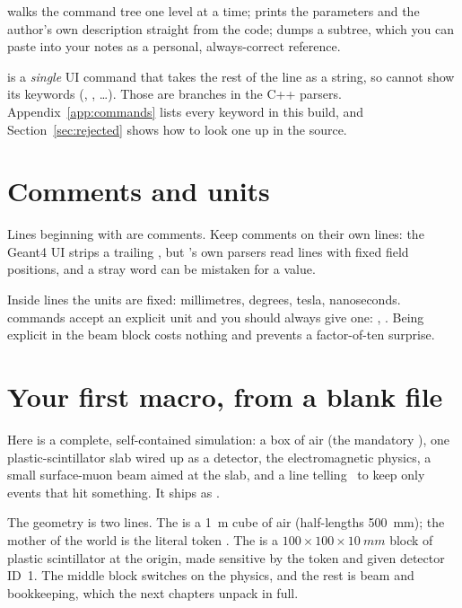  walks the command tree one level at a time;  prints the parameters and the author's own description straight from the code;  dumps a subtree, which you can paste into your notes as a personal, always-correct reference.

\begin{checkbuild}
 is a \emph{single} UI command that takes the rest of the line as a string, so  cannot show its keywords (, , \dots). Those are  branches in the C++ parsers. Appendix~\ref{app:commands} lists every keyword in this build, and Section~\ref{sec:rejected} shows how to look one up in the source.
\end{checkbuild}

\section{Comments and units}
Lines beginning with \code{#} are comments. Keep comments on their own lines: the Geant4 UI strips a trailing , but \musrSim's own parsers read  lines with fixed field positions, and a stray word can be mistaken for a value.

Inside  lines the units are fixed: millimetres, degrees, tesla, nanoseconds.  commands accept an explicit unit and you should always give one: , . Being explicit in the beam block costs nothing and prevents a factor-of-ten surprise.

\section{Your first macro, from a blank file}
\label{sec:firstmacro}
Here is a complete, self-contained simulation: a box of air (the mandatory ), one plastic-scintillator slab wired up as a detector, the electromagnetic physics, a small surface-muon beam aimed at the slab, and a line telling \musrSim\ to keep only events that hit something. It ships as .



The geometry is two lines. The  is a \SI{1}{m} cube of air (half-lengths \SI{500}{mm}); the mother of the world is the literal token . The  is a \(100\times100\times\SI{10}{mm}\) block of plastic scintillator at the origin, made sensitive by the token  and given detector ID~1. The middle block switches on the physics, and the rest is beam and bookkeeping, which the next chapters unpack in full.

